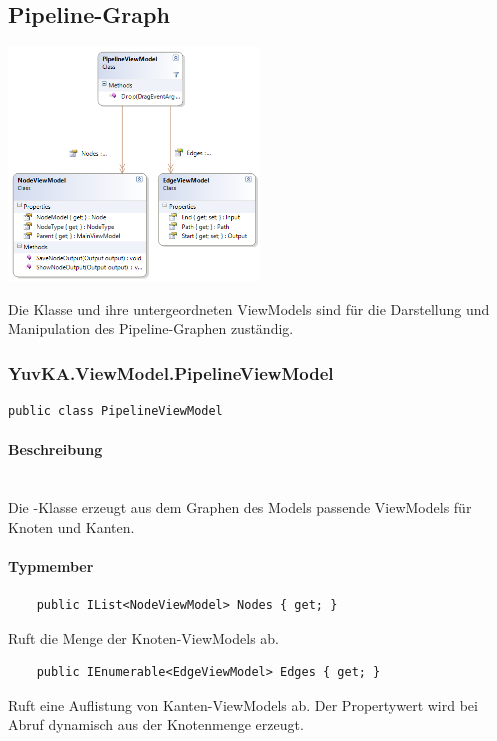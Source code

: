 \subsection{Pipeline-Graph}

\begin{center}	
\includegraphics[width=0.5\textwidth]{YuvKA.ViewModel/pipeline.png}
\end{center}
Die Klasse  und ihre untergeordneten ViewModels sind für die Darstellung und Manipulation des Pipeline-Graphen zuständig.

\subsubsection{YuvKA.ViewModel.PipelineViewModel}

\begin{verbatim}
public class PipelineViewModel
\end{verbatim}

\paragraph{Beschreibung}~\\
Die -Klasse erzeugt aus dem Graphen des Models passende ViewModels für Knoten und Kanten.

\paragraph{Typmember}
\begin{itemize}

	\begin{verbatim}
	public IList<NodeViewModel> Nodes { get; }
	\end{verbatim}
	Ruft die Menge der Knoten-ViewModels ab.

	\begin{verbatim}
	public IEnumerable<EdgeViewModel> Edges { get; }
	\end{verbatim}
	Ruft eine Auflistung von Kanten-ViewModels ab. Der Propertywert wird bei Abruf dynamisch aus der Knotenmenge erzeugt.

\end{itemize}


